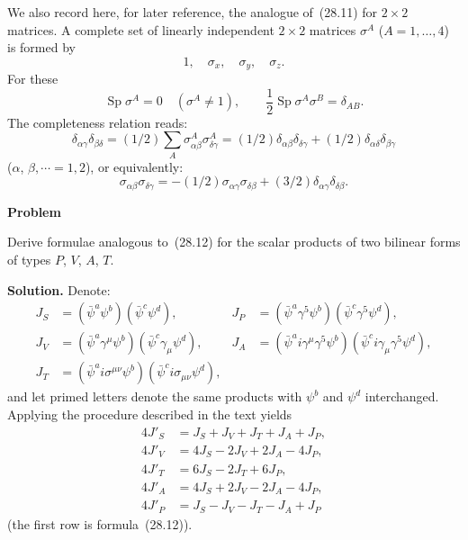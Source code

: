 We also record here, for later reference, the analogue of~(28.11) for $2 \times 2$ matrices. A complete set of linearly independent $2 \times 2$ matrices $\sigma^A$ ($A = 1,\ldots,4$) is formed by
\begin{equation}
1,\quad \sigma_x,\quad \sigma_y,\quad \sigma_z.
\tag{28.13}
\end{equation}
For these
\begin{equation}
\operatorname{Sp}\sigma^A = 0\quad (\sigma^A \neq 1),\qquad \frac{1}{2}\operatorname{Sp}\sigma^A\sigma^B = \delta_{AB}.
\tag{28.14}
\end{equation}
The completeness relation reads:
\begin{equation}
\delta_{\alpha\gamma}\delta_{\beta\delta} = (1/2)\sum_A\sigma^A_{\alpha\beta}\sigma^A_{\delta\gamma} = (1/2)\delta_{\alpha\beta}\delta_{\delta\gamma} + (1/2)\delta_{\alpha\delta}\delta_{\beta\gamma}
\tag{28.15}
\end{equation}
($\alpha$, $\beta, \cdots = 1, 2$), or equivalently:
\begin{equation}
\sigma_{\alpha\beta}\sigma_{\delta\gamma} = -(1/2)\sigma_{\alpha\gamma}\sigma_{\delta\beta} + (3/2)\delta_{\alpha\gamma}\delta_{\delta\beta}.
\tag{28.16}
\end{equation}

\begin{center}
\textbf{Problem}
\end{center}

Derive formulae analogous to~(28.12) for the scalar products of two bilinear forms of types $P$, $V$, $A$, $T$.

\textbf{Solution.} Denote:
\begin{align*}
J_S &= (\bar\psi^a\psi^b)(\bar\psi^c\psi^d), & J_P &= (\bar\psi^a\gamma^5\psi^b)(\bar\psi^c\gamma^5\psi^d),\\
J_V &= (\bar\psi^a\gamma^\mu\psi^b)(\bar\psi^c\gamma_\mu\psi^d), & J_A &= (\bar\psi^a i\gamma^\mu\gamma^5\psi^b)(\bar\psi^c i\gamma_\mu\gamma^5\psi^d),\\
J_T &= (\bar\psi^a i\sigma^{\mu\nu}\psi^b)(\bar\psi^c i\sigma_{\mu\nu}\psi^d),
\end{align*}
and let primed letters denote the same products with $\psi^b$ and $\psi^d$ interchanged. Applying the procedure described in the text yields
\begin{align*}
4J'_S &= J_S + J_V + J_T + J_A + J_P,\\
4J'_V &= 4J_S - 2J_V + 2J_A - 4J_P,\\
4J'_T &= 6J_S - 2J_T + 6J_P,\\
4J'_A &= 4J_S + 2J_V - 2J_A - 4J_P,\\
4J'_P &= J_S - J_V - J_T - J_A + J_P
\end{align*}
(the first row is formula~(28.12)).
